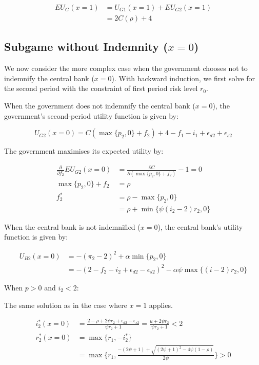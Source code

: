 \documentclass[
  a4paper,
  abstract=true]{scrartcl}
\theoremstyle{definition}
\begin{document}
\begin{align*}
EU_{G}(x=1)&=U_{G1}(x=1)+EU_{G2}(x=1) \\
&=2C(\rho)+4
\end{align*}

\subsection{\texorpdfstring{Subgame without Indemnity
(\(x=0\))}{Subgame without Indemnity (x=0)}}\label{sec-model-app-noindem}

We now consider the more complex case when the government chooses not to
indemnify the central bank (\(x=0\)). With backward induction, we first
solve for the second period with the constraint of first period risk
level \(r_0\).

When the government does not indemnify the central bank (\(x=0\)), the
government's second-period utility function is given by:

\[
U_{G2}(x=0)= C(\max\{p_2,0\}+f_2) + 4 -f_1-i_1 +\epsilon_{d2}+\epsilon_{s2}
\]

The government maximises its expected utility by:

\begin{align*}
\frac{\partial}{\partial f_2} EU_{G2}(x=0) &= \frac{\partial C}{\partial (\max\{p_2,0\} + f_2)} -1=0 \\
\max\{p_2,0\}+f_2 &= \rho \\
f_2^*&= \rho -\max\{p_2,0\} \\
&=\rho +\min\{\psi(i_2-2)r_2,0\}
\end{align*}

When the central bank is not indemnified (\(x=0\)), the central bank's
utility function is given by:

\begin{align*}
U_{B2}(x=0) &=-(\pi_2-2)^2+\alpha\min\{p_2,0\} \\
&=-(2-f_2-i_2+\epsilon_{d2}-\epsilon_{s2})^2-\alpha\psi\max\{(i-2)r_2,0\}
\end{align*}

When \(p>0\) and \(i_2<2\):

The same solution as in the case where \(x=1\) applies.

\begin{align*}
i_2^*(x=0) &= \frac{2-\rho+2\psi r_2+\epsilon_{d2}-\epsilon_{s2}}{\psi r_2+1}=\frac{u+2\psi r_2}{\psi r_2+1}<2 \\
r_2^*(x=0) &= \max\{r_1,-i^*_2\}\\
&=\max\{r_1,\frac{-(2\psi+1)+\sqrt{(2\psi+1)^2-4\psi(1-\rho)}}{2\psi}\}>0
\end{align*}
\end{document}
